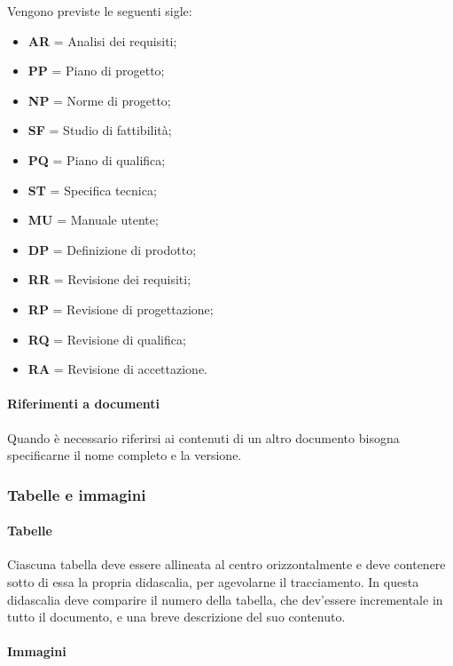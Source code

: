 	Vengono previste le seguenti sigle:
	
	\begin{itemize}

		\item \textbf{AR} = Analisi dei requisiti;
		\item \textbf{PP} = Piano di progetto;
		\item \textbf{NP} = Norme di progetto;
		\item \textbf{SF} = Studio di fattibilità;
		\item \textbf{PQ} = Piano di qualifica;
		\item \textbf{ST} = Specifica tecnica;
		\item \textbf{MU} = Manuale utente;
		\item \textbf{DP} = Definizione di prodotto;
		\item \textbf{RR} = Revisione dei requisiti;
		\item \textbf{RP} = Revisione di progettazione;
		\item \textbf{RQ} = Revisione di qualifica;
		\item \textbf{RA} = Revisione di accettazione.
	
	\end{itemize}
	
	\paragraph{Riferimenti a documenti}
	
	Quando è necessario riferirsi ai contenuti di un altro documento bisogna specificarne il nome completo e la versione.
	
\subsubsection{Tabelle e immagini}

	\paragraph{Tabelle}
	
	Ciascuna tabella deve essere allineata al centro orizzontalmente e deve contenere sotto di essa la propria didascalia, per agevolarne il tracciamento. In questa didascalia deve comparire il numero della tabella, che dev'essere incrementale in tutto il documento, e una breve descrizione del suo contenuto.
	
	\paragraph{Immagini}
	
